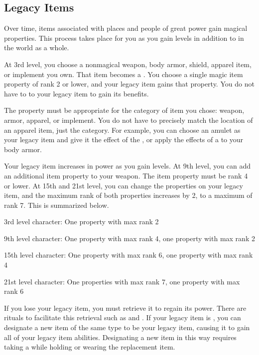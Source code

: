     \subsection{Legacy Items}\label{Legacy Items}

        Over time, items associated with places and people of great power gain magical properties.
        This process takes place for you as you gain levels in addition to in the world as a whole.

        At 3rd level, you choose a nonmagical weapon, body armor, shield, apparel item, or implement you own.
        That item becomes a .
        You choose a single magic item property of rank 2 or lower, and your legacy item gains that property.
        You do not have to  to your legacy item to gain its benefits.

        The property must be appropriate for the category of item you chose: weapon, armor, apparel, or implement.
        You do not have to precisely match the location of an apparel item, just the category.
        For example, you can choose an amulet as your legacy item and give it the effect of the , or apply the effects of a  to your body armor.

        Your legacy item increases in power as you gain levels.
        At 9th level, you can add an additional item property to your weapon.
        The item property must be rank 4 or lower.
        At 15th and 21st level, you can change the properties on your legacy item, and the maximum rank of both properties increases by 2, to a maximum of rank 7.
        This is summarized below.
        \begin{raggeditemize}
            \item 3rd level character: One property with max rank 2
            \item 9th level character: One property with max rank 4, one property with max rank 2
            \item 15th level character: One property with max rank 6, one property with max rank 4
            \item 21st level character: One properties with max rank 7, one property with max rank 6
        \end{raggeditemize}

        If you lose your legacy item, you must retrieve it to regain its power.
        There are rituals to facilitate this retrieval such as  and .
        If your legacy item is , you can designate a new item of the same type to be your legacy item, causing it to gain all of your legacy item abilities.
        Designating a new item in this way requires taking a  while holding or wearing the replacement item.

